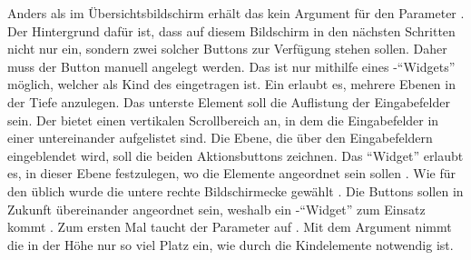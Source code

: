 Anders als im Übersichtsbildschirm erhält das  kein Argument für den Parameter .
Der Hintergrund dafür ist, dass auf diesem Bildschirm in den nächsten Schritten nicht nur ein, sondern zwei solcher Buttons zur Verfügung stehen sollen.
Daher muss der Button manuell angelegt werden.
Das ist nur mithilfe eines -\enquote{Widgets} möglich, welcher als Kind des  eingetragen ist.
Ein  erlaubt es, mehrere Ebenen in der Tiefe anzulegen.
Das unterste Element soll die Auflistung der Eingabefelder sein.
Der   bietet einen vertikalen Scrollbereich an, in dem die Eingabefelder in einer   untereinander aufgelistet sind.
Die Ebene, die  über den Eingabefeldern eingeblendet wird, soll die beiden Aktionsbuttons zeichnen.
Das \enquote{Widget}  erlaubt es, in dieser Ebene festzulegen, wo die Elemente angeordnet sein sollen .
Wie für den  üblich wurde die untere rechte Bildschirmecke gewählt .
Die Buttons sollen in Zukunft übereinander angeordnet sein, weshalb ein -\enquote{Widget} zum Einsatz kommt .
Zum ersten Mal taucht der Parameter  auf .
Mit dem Argument  nimmt die  in der Höhe nur so viel Platz ein,
wie durch die Kindelemente notwendig ist.


